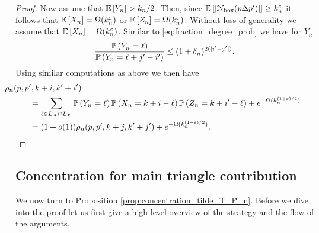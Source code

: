 \begin{proof}
Now assume that $\mathbb{E}\left[Y_n\right] > k_n/2$. Then, since $\mathbb{E}\left[\left|{\mathcal N}_{\text{box}}(p \Delta p^\prime)\right|\right] \ge k_n^{\varepsilon}$ it follows that $\mathbb{E}\left[X_n\right] = \Omega(k_n^\varepsilon)$ or $\mathbb{E}\left[Z_n\right] = \Omega(k_n^\varepsilon)$. Without loss of generality we assume that $\mathbb{E}\left[X_n\right] = \Omega(k_n^\varepsilon)$. Similar to \eqref{eq:fraction_degree_prob} we have for $Y_n$
\[
	\frac{\mathbb{P}\left(Y_n = \ell\right)}{\mathbb{P}\left(Y_n = \ell + j^\prime - i^\prime\right)} \le (1 + \delta_n)^{2(|i^\prime - j^\prime|)}.
\]
Using similar computations as above we then have
\begin{align*}
	&\hspace{-30pt}\rho_n(p,p^\prime,k+i,k^\prime+i^\prime) \\
	&= \sum_{\ell \in L_X \cap L_Y} \Prob{Y_n = \ell} \Prob{X_n = k + i - \ell}
		\Prob{Z_n = k + i^\prime - \ell}  + e^{-\Omega(k_n^{(1+\varepsilon)/2})}\\
	&= (1+o(1))\rho_n(p,p^\prime,k+j,k^\prime+j^\prime) + e^{-\Omega(k_n^{(1+\varepsilon)/2})}.
\end{align*}
\end{proof}

\subsection{Concentration for main triangle contribution}\label{ssec:concentration_tilde_T}

We now turn to Proposition \ref{prop:concentration_tilde_T_P_n}. Before we dive into the proof let us first give a high level overview of the strategy and the flow of the arguments. 


